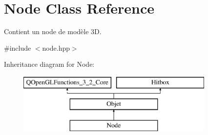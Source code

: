 \hypertarget{class_node}{\section{Node Class Reference}
\label{class_node}
}


Contient un node de modèle 3\+D.  




{\ttfamily \#include $<$node.\+hpp$>$}

Inheritance diagram for Node\+:\begin{figure}[H]
\begin{center}
\leavevmode
\includegraphics[height=3.000000cm]{class_node}
\end{center}
\end{figure}
